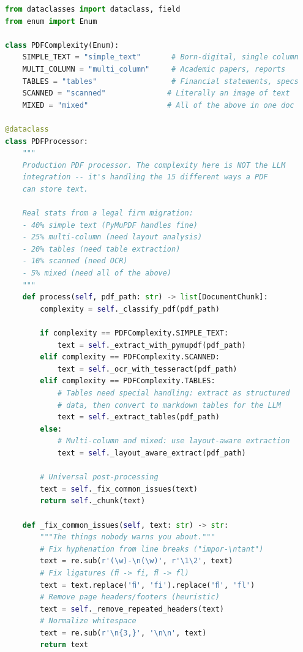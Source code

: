\begin{lstlisting}[language=Python, caption={Production PDF processing: the reality}]
from dataclasses import dataclass, field
from enum import Enum

class PDFComplexity(Enum):
    SIMPLE_TEXT = "simple_text"       # Born-digital, single column
    MULTI_COLUMN = "multi_column"     # Academic papers, reports
    TABLES = "tables"                 # Financial statements, specs
    SCANNED = "scanned"              # Literally an image of text
    MIXED = "mixed"                  # All of the above in one doc

@dataclass
class PDFProcessor:
    """
    Production PDF processor. The complexity here is NOT the LLM
    integration -- it's handling the 15 different ways a PDF
    can store text.
    
    Real stats from a legal firm migration:
    - 40% simple text (PyMuPDF handles fine)
    - 25% multi-column (need layout analysis)
    - 20% tables (need table extraction)  
    - 10% scanned (need OCR)
    - 5% mixed (need all of the above)
    """
    def process(self, pdf_path: str) -> list[DocumentChunk]:
        complexity = self._classify_pdf(pdf_path)
        
        if complexity == PDFComplexity.SIMPLE_TEXT:
            text = self._extract_with_pymupdf(pdf_path)
        elif complexity == PDFComplexity.SCANNED:
            text = self._ocr_with_tesseract(pdf_path)
        elif complexity == PDFComplexity.TABLES:
            # Tables need special handling: extract as structured
            # data, then convert to markdown tables for the LLM
            text = self._extract_tables(pdf_path)
        else:
            # Multi-column and mixed: use layout-aware extraction
            text = self._layout_aware_extract(pdf_path)
        
        # Universal post-processing
        text = self._fix_common_issues(text)
        return self._chunk(text)
    
    def _fix_common_issues(self, text: str) -> str:
        """The things nobody warns you about."""
        # Fix hyphenation from line breaks ("impor-\ntant")
        text = re.sub(r'(\w)-\n(\w)', r'\1\2', text)
        # Fix ligatures (ﬁ -> fi, ﬂ -> fl)
        text = text.replace('ﬁ', 'fi').replace('ﬂ', 'fl')
        # Remove page headers/footers (heuristic)
        text = self._remove_repeated_headers(text)
        # Normalize whitespace
        text = re.sub(r'\n{3,}', '\n\n', text)
        return text
\end{lstlisting}

